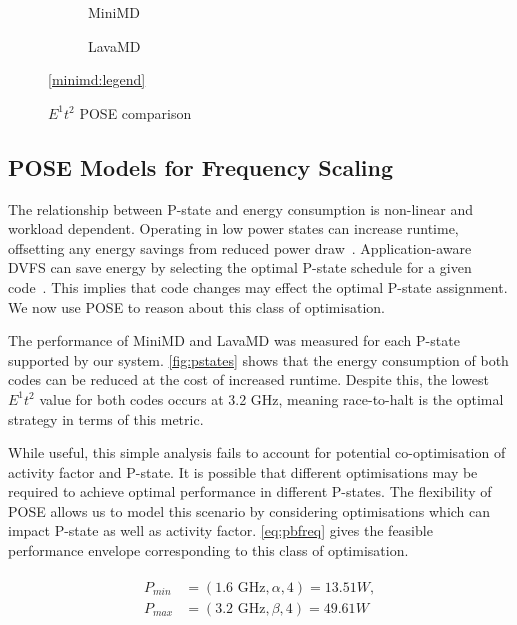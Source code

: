 \begin{figure*}[t]%
  \providecommand{\plotwidth}{.95\linewidth}
  \begin{subfigure}[t]{.5\linewidth}%
    \caption{MiniMD}%
    \label{fig:minimd_pose}
  \end{subfigure}%
  \begin{subfigure}[t]{.5\linewidth}%
    \caption{LavaMD}%
    \label{fig:lavamd_pose}
  \end{subfigure}%
  \begin{center}%
    \ref{minimd:legend}%
  \end{center}%
  \caption{$E^1t^2$ POSE comparison}%
  \label{fig:comparison}%
\end{figure*}


\subsection{POSE Models for Frequency Scaling}
The relationship between P-state and energy consumption is non-linear and workload dependent.
Operating in low power states can increase runtime, offsetting any energy savings from reduced power draw~\cite{le:2010aa}.
Application-aware DVFS can save energy by selecting the optimal P-state schedule for a given code~\cite{choi:2004aa}.
This implies that code changes may effect the optimal P-state assignment. 
We now use POSE to reason about this class of optimisation.

The performance of MiniMD and LavaMD was measured for each P-state supported by our system.
\autoref{fig:pstates} shows that the energy consumption of both codes can be reduced at the cost of increased runtime.
Despite this, the lowest $E^1t^2$ value for both codes occurs at 3.2 GHz, meaning race-to-halt is the optimal strategy in terms of this metric. 

While useful, this simple analysis fails to account for potential co-opti\-misa\-tion of activity factor and P-state.
It is possible that different optimisations may be required to achieve optimal performance in different P-states.
The flexibility of POSE allows us to model this scenario by considering optimisations which can impact P-state as well as activity factor.
\autoref{eq:pbfreq} gives the feasible performance envelope corresponding to this class of optimisation.

\begin{align}
  \label{eq:pbfreq}
  \begin{split}
    P_{min} &= (1.6\text{ GHz}, \alpha, 4) = 13.51W, \\
    P_{max} &= (3.2\text{ GHz}, \beta, 4) = 49.61W
  \end{split}
\end{align}



